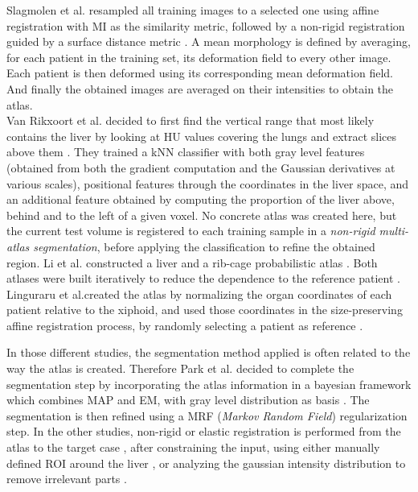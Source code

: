\documentclass[]{article}
\begin{document}
	Slagmolen et al. resampled all training images to a selected one using
	affine registration with MI as the similarity metric, followed by a
	non-rigid registration guided by a surface distance metric \cite{Slagmolen2007}. A mean
	morphology is defined by averaging, for each patient in the training
	set, its deformation field to every other image. Each patient is then
	deformed using its corresponding mean deformation field. And finally the
	obtained images are averaged on their intensities to obtain the atlas.\\
	Van Rikxoort et al. decided to first find the vertical range that most likely
	contains the liver by looking at HU values covering the lungs and
	extract slices above them \cite{Rikxoort2007}. They trained a kNN classifier with both gray
	level features (obtained from both the gradient computation and the
	Gaussian derivatives at various scales), positional features through the
	coordinates in the liver space, and an additional feature obtained by
	computing the proportion of the liver above, behind and to the left of a
	given voxel. No concrete atlas was created here, but the current test
	volume is registered to each training sample in a \emph{non-rigid
		multi-atlas segmentation}, before applying the classification to refine
	the obtained region.
	Li et al. constructed a liver and a rib-cage probabilistic atlas . Both
	atlases were built iteratively to reduce the dependence to the reference
	patient \cite{Li2010}. 
	Linguraru et al.created the atlas by normalizing the organ coordinates of
	each patient relative to the xiphoid, and used those coordinates in the
	size-preserving affine registration process, by randomly selecting a
	patient as reference \cite{Linguraru2009}.
	
	In those different studies, the segmentation method applied is often
	related to the way the atlas is created. Therefore Park et al. decided to complete the segmentation step by incorporating the
	atlas information in a bayesian framework which combines MAP and EM,
	with gray level distribution as basis \cite{Park2003}. The segmentation is then refined
	using a MRF (\emph{Markov Random Field}) regularization step. In the
	other studies, non-rigid or elastic registration is performed from the
	atlas to the target case \cite{Slagmolen2007, Linguraru2009, Li2010}, after constraining the input, using either manually defined
	ROI around the liver \cite{Slagmolen2007}, or analyzing the gaussian intensity distribution to
	remove irrelevant parts \cite{Li2010}.
	
\end{document}

